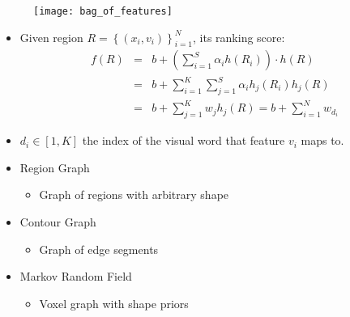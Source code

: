 \documentclass[11pt, a4paper, landscape]{article}
\begin{document}
\NewPage{}
\vfill
\begin{figure}
	\centering
	\texttt{[image: bag\_of\_features]}
\end{figure}
\begin{itemize}
\item Given region $R = \left\lbrace (x_i, v_i) \right\rbrace _{i = 1} ^N$, its ranking score:
\begin{equation*}
\begin{array}{lcl}
f(R) & = & b + (\sum\limits_{i = 1}^{S}\alpha_ih(R_i)) \cdot h(R)\\
     & = & b + \sum\limits_{i = 1}^{K}\sum\limits_{j = 1}^{S} \alpha_ih_j(R_i)h_j(R)\\
     & = & b + \sum\limits_{j = 1}^{K} w_jh_j(R) = b + \sum\limits_{i = 1}^{N} w_{d_i}
\end{array}
\end{equation*}
\item $d_i \in \left[ 1, K \right] $ the index of the visual word that feature $v_i$ maps to.
\end{itemize}
\vfill


\NewPage{}
\vfill
\begin{itemize}
\item Region Graph
\begin{itemize}
\item Graph of regions with arbitrary shape
\end{itemize}
\vfill
\item Contour Graph
\begin{itemize}
\item Graph of edge segments
\end{itemize}
\vfill
\item Markov Random Field
\begin{itemize}
\item Voxel graph with shape priors
\end{itemize}
\end{itemize}
\vfill
\end{document}
